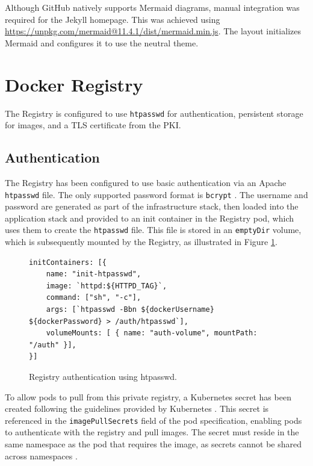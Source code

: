 Although GitHub natively supports Mermaid diagrams, manual integration was required for the Jekyll homepage. This was achieved using \url{https://unpkg.com/mermaid@11.4.1/dist/mermaid.min.js}. The layout initializes Mermaid and configures it to use the neutral theme.

\section{Docker Registry}
The Registry is configured to use \texttt{htpasswd} for authentication, persistent storage for images, and a TLS certificate from the PKI.

\subsection{Authentication}
The Registry has been configured to use basic authentication via an Apache \texttt{htpasswd} file. The only supported password format is \texttt{bcrypt} \parencite{docker_distribution_config}. The username and password are generated as part of the infrastructure stack, then loaded into the application stack and provided to an init container in the Registry pod, which uses them to create the \texttt{htpasswd} file. This file is stored in an \texttt{emptyDir} volume, which is subsequently mounted by the Registry, as illustrated in Figure \ref{fig:registry_auth}.

\begin{figure}[h]
    \centering
\begin{verbatim}
initContainers: [{
    name: "init-htpasswd",
    image: `httpd:${HTTPD_TAG}`,
    command: ["sh", "-c"],
    args: [`htpasswd -Bbn ${dockerUsername} ${dockerPassword} > /auth/htpasswd`],
    volumeMounts: [ { name: "auth-volume", mountPath: "/auth" }],
}]
\end{verbatim}
    \caption{Registry authentication using htpasswd.}
    \label{fig:registry_auth}
\end{figure}

To allow pods to pull from this private registry, a Kubernetes secret has been created following the guidelines provided by Kubernetes \parencite{kubernetes_private_registry}. This secret is referenced in the \texttt{imagePullSecrets} field of the pod specification, enabling pods to authenticate with the registry and pull images. The secret must reside in the same namespace as the pod that requires the image, as secrets cannot be shared across namespaces \parencite{kubernetes_imagepullsecrets}.

